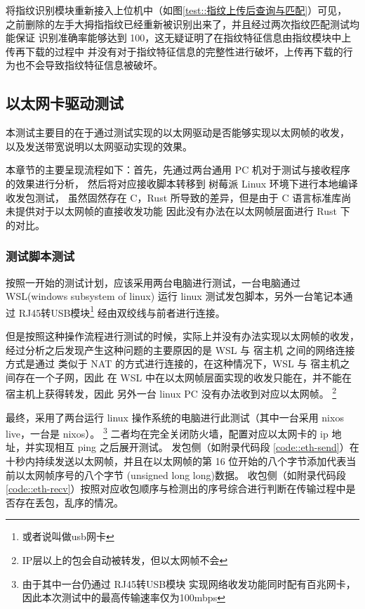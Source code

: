     将指纹识别模块重新接入上位机中（如图\ref{test::指纹上传后查询与匹配}）可见，
    之前删除的左手大拇指指纹已经重新被识别出来了，并且经过两次指纹匹配测试均能保证
    识别准确率能够达到 100，这无疑证明了在指纹特征信息由指纹模块中上传再下载的过程中
    并没有对于指纹特征信息的完整性进行破坏，上传再下载的行为也不会导致指纹特征信息被破坏。

    \subsection{以太网卡驱动测试}

    本测试主要目的在于通过测试实现的以太网驱动是否能够实现以太网帧的收发，
    以及发送带宽说明以太网驱动实现的效果。

    本章节的主要呈现流程如下：首先，先通过两台通用 PC 机对于测试与接收程序的效果进行分析，
    然后将对应接收脚本转移到 树莓派 Linux 环境下进行本地编译收发包测试，
    虽然固然存在 C，Rust 所导致的差异，但是由于 C 语言标准库尚未提供对于以太网帧的直接收发功能
    因此没有办法在以太网帧层面进行 Rust 下的对比。

    \subsubsection{测试脚本测试}

    按照一开始的测试计划，应该采用两台电脑进行测试，一台电脑通过 WSL(windows subsystem of linux) 
    运行 linux 测试发包脚本，另外一台笔记本通过 RJ45转USB模块\footnote{或者说叫做usb网卡}
    经由双绞线与前者进行连接。

    但是按照这种操作流程进行测试的时候，实际上并没有办法实现以太网帧的收发，
    经过分析之后发现产生这种问题的主要原因的是 WSL 与 宿主机 之间的网络连接方式是通过
    类似于 NAT 的方式进行连接的，在这种情况下，WSL 与 宿主机之间存在一个子网，因此
    在 WSL 中在以太网帧层面实现的收发只能在，并不能在宿主机上获得转发，因此
    另外一台 linux PC 没有办法收到对应以太网帧。
    \footnote{IP层以上的包会自动被转发，但以太网帧不会}

    最终，采用了两台运行 linux 操作系统的电脑进行此测试（其中一台采用 nixos live，一台是 nixos）。
    \footnote{由于其中一台仍通过 RJ45转USB模块 实现网络收发功能同时配有百兆网卡，因此本次测试中的最高传输速率仅为100mbps}
    二者均在完全关闭防火墙，配置对应以太网卡的 ip 地址，并实现相互 ping 之后展开测试。
    发包侧（如附录代码段 \ref{code::eth-send}）在十秒内持续发送以太网帧，并且在以太网帧的第 16 位开始的八个字节添加代表当前以太网帧序号的八个字节 (unsigned long long)数据。
    收包侧（如附录代码段 \ref{code::eth-recv}）按照对应收包顺序与检测出的序号综合进行判断在传输过程中是否存在丢包，乱序的情况。


